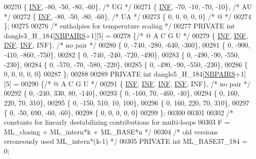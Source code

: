 \begin{DoxyCode}
00270    \{ \hyperlink{energy__const_8h_a12c2040f25d8e3a7b9e1c2024c618cb6}{INF},  -80,  -50,  -80,  -60\},  \textcolor{comment}{/* UG */}
00271    \{ \hyperlink{energy__const_8h_a12c2040f25d8e3a7b9e1c2024c618cb6}{INF},  -70,  -10,  -70,  -10\},  \textcolor{comment}{/* AU */}
00272    \{ \hyperlink{energy__const_8h_a12c2040f25d8e3a7b9e1c2024c618cb6}{INF},  -80,  -50,  -80,  -60\},  \textcolor{comment}{/* UA */}
00273    \{   0,    0,     0,    0,   0\}   \textcolor{comment}{/*  @ */}
00274 \};
00275 
00276 \textcolor{comment}{/* enthalpies for temperature scaling */}
00277 PRIVATE \textcolor{keywordtype}{int} dangle3\_H\_184[\hyperlink{energy__const_8h_a5e75221c779d618eab81e096f37e32ce}{NBPAIRS}+1][5] =
00278 \{\textcolor{comment}{/*   @     A     C     G     U   */}
00279    \{ \hyperlink{energy__const_8h_a12c2040f25d8e3a7b9e1c2024c618cb6}{INF},  \hyperlink{energy__const_8h_a12c2040f25d8e3a7b9e1c2024c618cb6}{INF},  \hyperlink{energy__const_8h_a12c2040f25d8e3a7b9e1c2024c618cb6}{INF},  \hyperlink{energy__const_8h_a12c2040f25d8e3a7b9e1c2024c618cb6}{INF},  INF\},  \textcolor{comment}{/* no pair */}
00280    \{   0, -740, -280, -640, -360\},
00281    \{   0, -900, -410, -860, -750\},
00282    \{   0, -740, -240, -720, -490\},
00283    \{   0, -490,  -90, -550, -230\},
00284    \{   0, -570,  -70, -580, -220\},
00285    \{   0, -490,  -90, -550, -230\},
00286    \{   0,    0,    0,    0,   0\}
00287 \};
00288 
00289 PRIVATE \textcolor{keywordtype}{int} dangle5\_H\_184[\hyperlink{energy__const_8h_a5e75221c779d618eab81e096f37e32ce}{NBPAIRS}+1][5] =
00290 \{\textcolor{comment}{/*   @     A     C     G     U   */}
00291    \{ \hyperlink{energy__const_8h_a12c2040f25d8e3a7b9e1c2024c618cb6}{INF},  \hyperlink{energy__const_8h_a12c2040f25d8e3a7b9e1c2024c618cb6}{INF},  \hyperlink{energy__const_8h_a12c2040f25d8e3a7b9e1c2024c618cb6}{INF},  \hyperlink{energy__const_8h_a12c2040f25d8e3a7b9e1c2024c618cb6}{INF},  INF\},  \textcolor{comment}{/* no pair */}
00292    \{   0, -240,  330,   80, -140\},
00293    \{   0, -160,   70, -460,  -40\},
00294    \{   0,  160,  220,   70,  310\},
00295    \{   0, -150,  510,   10,  100\},
00296    \{   0,  160,  220,   70,  310\},
00297    \{   0,  -50,  690,  -60,  -60\},
00298    \{   0,    0,    0,    0,   0\}
00299 \};
00300 
00301 
00302 \textcolor{comment}{/* constants for linearly destabilizing contributions for multi-loops}
00303 \textcolor{comment}{   F = ML\_closing + ML\_intern*k + ML\_BASE*u  */}
00304 \textcolor{comment}{/* old versions erroneously used ML\_intern*(k-1) */}
00305 PRIVATE \textcolor{keywordtype}{int} ML\_BASE37\_184 = 0;

\end{DoxyCode}
